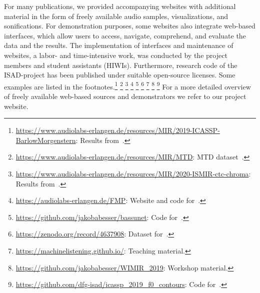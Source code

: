 \documentclass[11pt,a4paper]{article}
\def\PN{\mathrm{ISAD}}
\newenvironment{itemizePacked}{
\begin{itemize}
  \setlength{\itemsep}{1pt}
  \setlength{\parskip}{0pt}
  \setlength{\parsep}{0pt}
  \renewcommand{\labelitemi}{$\bullet$}
}{\end{itemize}}
\theoremstyle{plain} \newtheorem{define}{Definition}[section]
\begin{document}
{For many publications, we provided accompanying websites with additional material in the form of freely available audio samples, visualizations, and sonifications. For demonstration purposes, some websites also integrate web-based interfaces, which allow users to access, navigate, comprehend, and evaluate the data and the results. The implementation of interfaces and maintenance of websites, a labor- and time-intensive work, was conducted by the project members and student assistants (HIWIs). Furthermore, research code of the $\PN$-project has been published under suitable open-source licenses. Some examples are listed in the footnotes.\footnote{\url{https://www.audiolabs-erlangen.de/resources/MIR/2019-ICASSP-BarlowMorgenstern}:
Results from~\cite{ZalkowBM19_SalienceRetrieval_ICASSP}.}
\footnote{\url{https://www.audiolabs-erlangen.de/resources/MIR/MTD}: MTD dataset~\cite{ZalkowBAM20_MTD_TISMIR}.}
\footnote{\url{https://www.audiolabs-erlangen.de/resources/MIR/2020-ISMIR-ctc-chroma}: Results from~\cite{ZalkowM20_WeaklyAlignedTrain_ISMIR}.}
\footnote{\url{https://audiolabs-erlangen.de/FMP}: Website and code for~\cite{MuellerZ19_FMP_ISMIR}.}
\footnote{\url{https://github.com/jakobabesser/bassunet}: Code for~\cite{AbesserM21_JazzBassTranscription_Electronics}.}
\footnote{\url{https://zenodo.org/record/4637908}: Dataset for~\cite{TaenzerMA21_LocalPolyphonyEstimation_Electronics}.}
\footnote{\url{https://machinelistening.github.io/}:  Teaching material.}
\footnote{\url{https://github.com/jakobabesser/WIMIR_2019}: Workshop material.}
\footnote{\url{https://github.com/dfg-isad/icassp_2019_f0_contours}: Code for~\cite{AbesserMueller19_ContourClassification_ICASSP}.}
%
For a more detailed overview of freely available web-based sources and demonstrators we refer to our project website\footnotemark[\ref{pro_res_url}].




}
\end{document}
